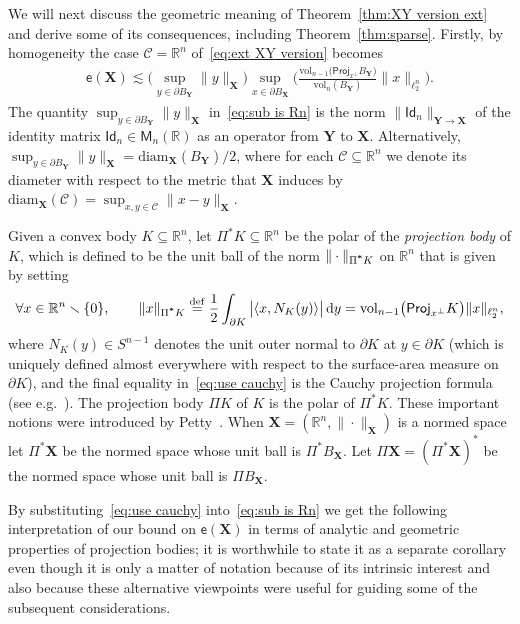\documentclass[11pt,reqno]{amsart}
\renewcommand{\setminus}{\smallsetminus}
\newcommand{\ud}[0]{\,\mathrm{d}}
\newcommand{\diam}{\mathrm{diam}}
\newcommand{\proj}{\mathsf{Proj}}
\newcommand{\X}{\mathbf X}
\newcommand{\Y}{\mathbf Y}
\newcommand{\R}{\mathbb R}
\theoremstyle{remark}
\newcommand{\Id}{\mathsf{Id}}
\newcommand{\M}{\mathsf{M}}
\renewcommand{\subset}{\subseteq}
\newcommand{\eqdef}{\stackrel{\mathrm{def}}{=}}
\newcommand{\ee}{\mathsf{e}}
\newcommand{\sub}{\mathscr{C}}
\newcommand{\vol}{\mathrm{vol}}
\renewcommand{\1}{\mathbf 1}
\begin{document}
We will next discuss the geometric meaning of Theorem~\ref{thm:XY version ext} and derive some of its consequences, including Theorem~\ref{thm:sparse}. Firstly, by homogeneity the case $\sub=\R^n$ of~\eqref{eq:ext XY version} becomes
\begin{align}\label{eq:sub is Rn}
\ee(\X)\lesssim \big(\sup_{y\in \partial B_\Y} \|y\|_{\X}\big)\sup_{x\in \partial B_\X}\bigg(\frac{\vol_{n-1}\big(\proj_{x^\perp}B_{\Y}\big)}{\vol_n(B_{\Y})}\|x\|_{\ell_2^n}\bigg).
\end{align}
The quantity $\sup_{y\in \partial B_\Y} \|y\|_{\X}$ in~\eqref{eq:sub is Rn} is the norm $\|\Id_n\|_{\Y\to \X}$ of the identity matrix $\Id_n\in \M_n(\R)$ as an operator from $\Y$ to $\X$. Alternatively,  $\sup_{y\in \partial B_\Y} \|y\|_{\X}=\diam_\X(B_\Y)/2$, where for each $\sub\subset \R^n$ we denote its diameter with respect to the metric that $\X$ induces by $\diam_\X(\sub)=\sup_{x,y\in \sub} \|x-y\|_\X$.

Given a convex body $K\subset \R^n$, let $\Pi^*K\subset \R^n$ be the polar of the {\em projection body} of $K$, which is defined to be the unit ball of the norm $\|\cdot\|_{\Pi^{\textbf *}K}$ on $\R^n$ that is given by setting
\begin{equation}\label{eq:use cauchy}
\forall  x\in \R^n\setminus \{0\},\qquad \|x\|_{\Pi^{\textbf *}K}\eqdef \frac12 \int_{\partial K}\big|\langle x,N_K(y)\rangle\big|\ud y =\vol_{n-1}\big(\proj_{x^\perp}K\big)\|x\|_{\ell_2^n},
\end{equation}
where $N_K(y)\in S^{n-1}$ denotes the unit outer normal  to $\partial K$ at $y\in \partial K$ (which is uniquely defined almost everywhere with respect to the surface-area measure on $\partial K$), and the final equality in~\eqref{eq:use cauchy} is the  Cauchy projection formula (see e.g.~\cite[Appendix~A]{Gar06}). The projection body $\Pi K$ of $K$ is the polar of $\Pi^*K$. These important notions were introduced by Petty~\cite{Pet67}. When $\X=(\R^n,\|\cdot\|_\X)$ is a normed space let  $\Pi^*\X$ be the normed space whose unit ball is $\Pi^*B_\X$. Let $\Pi \X= (\Pi^*\X)^*$ be the normed space whose unit ball is $\Pi B_\X$.



 By substituting~\eqref{eq:use cauchy} into~\eqref{eq:sub is Rn} we get the following interpretation of our bound on $\ee(\X)$ in terms of analytic and geometric properties of projection bodies; it is worthwhile to state it as a separate corollary even though it is only a matter of notation because of its intrinsic interest and also because   these alternative viewpoints were useful for guiding some of the subsequent considerations.
\end{document}
